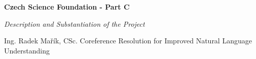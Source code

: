 \documentclass[11pt,american,oneside]{article}
\begin{document}
{\Large  \noindent \textbf{Czech Science Foundation - Part C}}

\begin{center}
	\Large \textit{Description and Substantiation of the Project}
\end{center}


\vspace{.25cm}
\begin{minipage}{.9\textwidth}
{\noindent

    \begin{description}[style=unboxed,leftmargin=0cm,labelindent=0cm]
        \customitem[Applicant:] Ing. Radek Mařík, CSc. 
         Coreference Resolution for Improved Natural Language Understanding
    \end{description}

}
\end{minipage}




\end{document}
